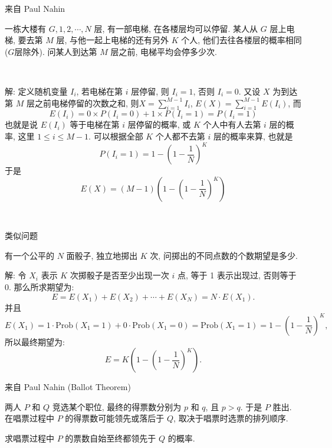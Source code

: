 \newpage

\noindent 来自 Paul Nahin

一栋大楼有 $G,1,2,\cdots,N$ 层, 有一部电梯, 在各楼层均可以停留. 某人从 $G$ 层上电梯, 要去第 $M$ 层, 与他一起上电梯的还有另外 $K$ 个人, 他们去往各楼层的概率相同 ($G$层除外). 问某人到达第 $M$ 层之前, 电梯平均会停多少次.

~

解: 定义随机变量 $I_i$, 若电梯在第 $i$ 层停留, 则 $I_i = 1$, 否则 $I_i = 0$. 又设 $X$ 为到达第 $M$ 层之前电梯停留的次数之和, 则$\displaystyle X = \sum_{i=1}^{M-1}I_i$, $\displaystyle E(X) = \sum_{i=1}^{M-1} E(I_i)$, 而
\[E(I_i) = 0\times P(I_i = 0) + 1\times P(I_i=1) = P(I_i=1)\]
也就是说 $E(I_i)$ 等于电梯在第 $i$ 层停留的概率, 或 $K$ 个人中有人去第 $i$ 层的概率, 这里 $1\le i\le M - 1$. 可以根据全部 $K$ 个人都不去第 $i$ 层的概率来算, 也就是
\[
P(I_i=1) = 1 - (1-\frac{1}{N})^K
\]
于是
\[
E(X) = (M-1)\left(1-(1-\frac{1}{N})^K\right)
\]

~

\noindent 类似问题

有一个公平的 $N$ 面骰子, 独立地掷出 $K$ 次, 问掷出的不同点数的个数期望是多少.

解: 令 $X_i$ 表示 $K$ 次掷骰子是否至少出现一次 $i$ 点, 等于 1 表示出现过, 否则等于 0. 那么所求期望为:
\[E = E(X_1)+E(X_2)+\cdots+E(X_N) = N\cdot E(X_1) .\]
并且
\[
E(X_1) = 1\cdot\mathrm{Prob}(X_1=1)+0\cdot\mathrm{Prob}(X_1=0) = \mathrm{Prob}(X_1=1) = 1-(1-\frac{1}{N})^K ,
\]
所以最终期望为:
\[E = K\left(1-(1-\frac{1}{N})^K \right) .\]

\newpage
\noindent 来自 Paul Nahin (Ballot Theorem)

两人 $P$ 和 $Q$ 竞选某个职位, 最终的得票数分别为 $p$ 和 $q$, 且 $p>q$. 于是 $P$ 胜出. 在唱票过程中 $P$ 的得票数可能领先或落后于 $Q$, 取决于唱票时选票的排列顺序. 

求唱票过程中 $P$ 的票数自始至终都领先于 $Q$ 的概率.

~

